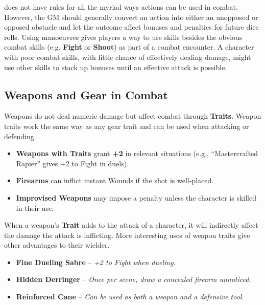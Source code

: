 \begin{multicols}{2}
\wyrd does not have rules for all the myriad ways actions can be used in combat. However, the GM should generally convert an action into either an unopposed or opposed obstacle and let the outcome affect bonuses and penalties for future dice rolls. Using manoeuvres gives players a way to use skills besides the obvious combat skills (e.g. \textbf{Fight} or \textbf{Shoot}) as part of a combat encounter. A character with poor combat skills, with little chance of effectively dealing damage, might use other skills to stack up bonuses until an effective attack is possible.

\subsection{Weapons and Gear in Combat}
Weapons do not deal numeric damage but affect combat through \textbf{Traits}. Weapon traits work the same way as any gear trait and can be used when attacking or defending.

\begin{Example}
	\begin{itemize}
    	\item \textbf{Weapons with Traits} grant \textbf{+2} in relevant situations (e.g., “Mastercrafted Rapier” gives +2 to Fight in duels).
	    \item \textbf{Firearms} can inflict instant Wounds if the shot is well-placed.
    	\item \textbf{Improvised Weapons} may impose a penalty unless the character is skilled in their use.
	\end{itemize}
\end{Example}

When a weapon's \textbf{Trait} adds to the attack of a character, it will indirectly affect the damage the attack is inflicting. More interesting uses of weapon traits give other advantages to their wielder.

\begin{Example}
	\begin{itemize}
    	\item \textbf{Fine Dueling Sabre} – \textit{+2 to Fight when dueling.}
	    \item \textbf{Hidden Derringer} – \textit{Once per scene, draw a concealed firearm unnoticed.}
	    \item \textbf{Reinforced Cane} – \textit{Can be used as both a weapon and a defensive tool.}
	\end{itemize}
\end{Example}


\end{multicols}
